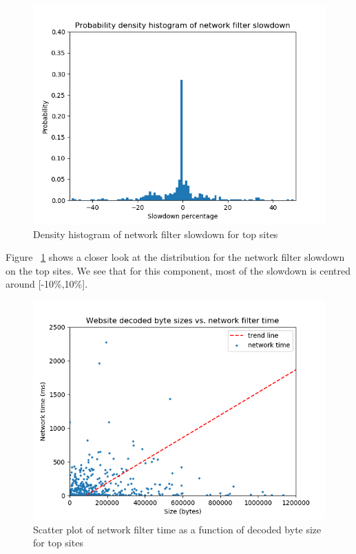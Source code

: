 \begin{figure}[h]
	\includegraphics[scale=0.5]{results/density_histogram_filter_slowdown}
	\caption{Density histogram of network filter slowdown for top sites}
	\label{fig:histogram_slowdown}
\end{figure}


Figure ~\ref{fig:histogram_slowdown} shows a closer look at the distribution for the network filter slowdown on the top sites. We see that for this component, most of the slowdown is centred around [-10\%,10\%].

\begin{figure}[h]
	\includegraphics[scale=0.5]{results/byte_size_vs_filter_time}
	\caption{Scatter plot of network filter time as a function of decoded byte size for top sites}
	\label{fig:network_filter_decoded_size}
\end{figure}

